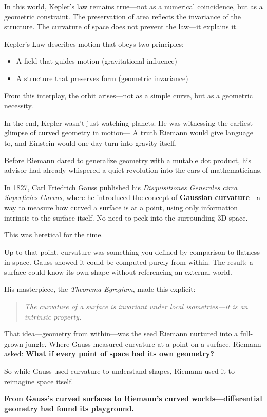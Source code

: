 In this world, Kepler’s law remains true—not as a numerical coincidence, but as a geometric constraint. The preservation of area reflects the invariance of the structure. The curvature of space does not prevent the law—it explains it.

\begin{tcolorbox}[colback=blue!5!white, colframe=blue!50!black,
title={Kepler’s Law in Riemann’s Language}]
Kepler’s Law describes motion that obeys two principles:

\begin{itemize}
  \item A field that guides motion (gravitational influence)
  \item A structure that preserves form (geometric invariance)
\end{itemize}

From this interplay, the orbit arises—not as a simple curve, but as a geometric necessity.
\end{tcolorbox}

In the end, Kepler wasn’t just watching planets.  
He was witnessing the earliest glimpse of curved geometry in motion—  
A truth Riemann would give language to, and Einstein would one day turn into gravity itself.



\begin{tcolorbox}[colback=gray!5!white, colframe=black, title={Historical Sidebar: How Gaussian Curvature Paved the Road to Riemann}]
  Before Riemann dared to generalize geometry with a mutable dot product, his advisor had already whispered a quiet revolution into the ears of mathematicians.
  
  In 1827, Carl Friedrich Gauss published his \textit{Disquisitiones Generales circa Superficies Curvas}, where he introduced the concept of \textbf{Gaussian curvature}—a way to measure how curved a surface is at a point, using only information intrinsic to the surface itself. No need to peek into the surrounding 3D space.
  
  This was heretical for the time.
  
  Up to that point, curvature was something you defined by comparison to flatness in space. Gauss showed it could be computed purely from within. The result: a surface could know its own shape without referencing an external world.
  
  His masterpiece, the \textit{Theorema Egregium}, made this explicit:
  \begin{quote}
  \textit{The curvature of a surface is invariant under local isometries—it is an intrinsic property.}
  \end{quote}
  
  That idea—geometry from within—was the seed Riemann nurtured into a full-grown jungle. Where Gauss measured curvature at a point on a surface, Riemann asked: 
  \textbf{What if every point of space had its own geometry?}
  
  So while Gauss used curvature to understand shapes,
  Riemann used it to reimagine space itself.
  
  \textbf{From Gauss’s curved surfaces to Riemann’s curved worlds—differential geometry had found its playground.}
\end{tcolorbox}
